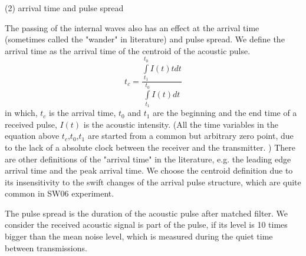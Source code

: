 (2) arrival time and pulse spread

The passing of the internal waves also has an effect at the arrival time (sometimes called the "wander" in literature) and pulse spread. We define the arrival time as the arrival time of the centroid of the acoustic pulse.
\begin{equation}\label{eq:arrival_time}
t_c =\frac {\int\limits^{t_0}_{t_1}I(t)tdt}{\int\limits^{t_0}_{t_1}I(t)dt}
\end{equation} 
in which, $t_c$ is the arrival time, $t_0$ and $t_1$ are the beginning and the end time of a received pulse, $I(t)$ is the acoustic intensity. (All the time variables in the equation above $t_c$,$t_0$,$t_1$ are started from a common but arbitrary zero point, due to the lack of a absolute clock between the receiver and the transmitter. )
There are other definitions of the "arrival time" in the literature, e.g. the leading edge arrival time and the peak arrival time. We choose the centroid definition due to its insensitivity to the swift changes of the arrival pulse structure, which are quite common in SW06 experiment. 

The pulse spread is the duration of the acoustic pulse after matched filter. We consider the received acoustic signal is part of the pulse, if its level is 10 times bigger than the mean noise level, which is measured during the quiet time between transmissions.


